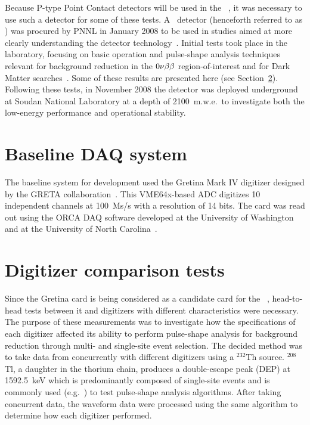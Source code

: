	Because P-type Point Contact detectors will be used in the \MJ~\minmod, it was necessary to use such a detector for some of these tests.  A \ppc~detector (henceforth referred to as ) was procured by PNNL in January 2008 to be used in studies aimed at more clearly understanding the detector technology~\cite{Orr2007}.  Initial tests took place in the laboratory, focusing on basic operation and pulse-shape analysis techniques relevant for background reduction in the $0 \nu \beta \beta$ region-of-interest and for Dark Matter searches~\cite{Orr2008}.  Some of these results are presented here (see Section~\ref{sec:HeadToHeadCompare}).  Following these tests, in November 2008 the detector was deployed underground at Soudan National Laboratory at a depth of 2100~m.w.e.~to investigate both the low-energy performance and operational stability.
	   
	\section{Baseline DAQ system}

	The baseline system for development used the Gretina Mark IV digitizer designed by the GRETA collaboration~\cite{Anderson:2009p1293}.  This VME64x-based ADC digitizes 10 independent channels at 100~Ms/s with a resolution of 14 bits.  The card was read out using the ORCA DAQ software developed at the University of Washington and at the University of North Carolina~\cite{Howe04,ORCA}.%
	
	\section{Digitizer comparison tests}
     	\label{sec:HeadToHeadCompare}
	
	Since the Gretina card is being considered as a candidate card for the \MJ~\minmod, head-to-head tests between it and digitizers with different characteristics were necessary.  The purpose of these measurements was to investigate how the specifications of each digitizer affected its ability to perform pulse-shape analysis for background reduction through multi- and single-site event selection.  The decided method was to take data from  concurrently with different digitizers using a $^{232}$Th source.  $^{208}$Tl, a daughter in the thorium chain, produces a double-escape peak (DEP) at 1592.5~keV which is predominantly composed of single-site events and is commonly used (e.g.~\cite{Abt2007332,Orrell:2007tt}) to test pulse-shape analysis algorithms.  After taking concurrent data, the waveform data were processed using the same algorithm to determine how each digitizer performed.
	
